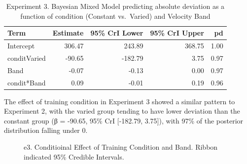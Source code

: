 \documentclass[
  letterpaper,
  DIV=11,
  numbers=noendperiod,
  oneside]{scrartcl}
\begin{document}
\begin{longtable}[]{@{}lrrrr@{}}

\caption{\label{tbl-e3-bmm-dist}Experiment 3. Bayesian Mixed Model
predicting absolute deviation as a function of condition (Constant
vs.~Varied) and Velocity Band}

\tabularnewline

\toprule\noalign{}
Term & Estimate & 95\% CrI Lower & 95\% CrI Upper & pd \\
\midrule\noalign{}
\endhead
\bottomrule\noalign{}
\endlastfoot
Intercept & 306.47 & 243.89 & 368.75 & 1.00 \\
conditVaried & -90.65 & -182.79 & 3.75 & 0.97 \\
Band & -0.07 & -0.13 & 0.00 & 0.97 \\
condit*Band & 0.09 & -0.01 & 0.19 & 0.96 \\

\end{longtable}

The effect of training condition in Experiment 3 showed a similar
pattern to Experiment 2, with the varied group tending to have lower
deviation than the constant group (β = -90.65, 95\% CrI {[}-182.79,
3.75{]}), with 97\% of the posterior distribution falling under 0.

\begin{figure}


\caption{\label{fig-e3-bmm-dist}e3. Conditioinal Effect of Training
Condition and Band. Ribbon indicated 95\% Credible Intervals.}

\end{figure}%
\end{document}
